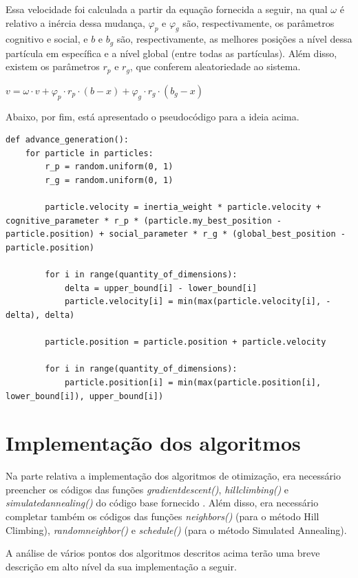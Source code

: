 \documentclass[conference]{IEEEtran}
\begin{document}
Essa velocidade foi calculada a partir da equação fornecida a seguir, na qual $\omega$ é relativo a inércia dessa mudança, $\varphi_p$ e $\varphi_g$ são, respectivamente, os parâmetros cognitivo e social, e $b$ e $b_g$ são, respectivamente, as melhores posições a nível dessa partícula em específica e a nível global (entre todas as partículas). Além disso, existem os parâmetros $r_p$ e $r_g$, que conferem aleatoriedade ao sistema.

$v = \omega \cdot v + \varphi_p \cdot r_p \cdot \left ( b - x \right ) + \varphi_g \cdot r_g \cdot \left ( b_g - x \right )$

Abaixo, por fim, está apresentado o pseudocódigo para a ideia acima.

\begin{lstlisting}
def advance_generation():
	for particle in particles:
		r_p = random.uniform(0, 1)
		r_g = random.uniform(0, 1)

		particle.velocity = inertia_weight * particle.velocity + cognitive_parameter * r_p * (particle.my_best_position - particle.position) + social_parameter * r_g * (global_best_position - particle.position)

		for i in range(quantity_of_dimensions):
			delta = upper_bound[i] - lower_bound[i]
    		particle.velocity[i] = min(max(particle.velocity[i], -delta), delta)
		
		particle.position = particle.position + particle.velocity

		for i in range(quantity_of_dimensions):
    		particle.position[i] = min(max(particle.position[i], lower_bound[i]), upper_bound[i])
\end{lstlisting}

\section{Implementação dos algoritmos}
Na parte relativa a implementação dos algoritmos de otimização, era necessário preencher os códigos das funções \textit{gradient\underline{\space}descent()}, \textit{hill\underline{\space}climbing()} e \textit{simulated\underline{\space}annealing()} do código base fornecido \cite{b1}.  Além disso, era necessário completar também os códigos das funções \textit{neighbors()} (para o método Hill Climbing), \textit{random\underline{\space}neighbor()} e \textit{schedule()} (para o método Simulated Annealing). 

A análise de vários pontos dos algoritmos descritos acima terão uma breve descrição em alto nível da sua implementação a seguir. 
\end{document}
